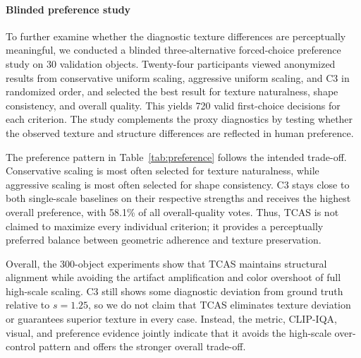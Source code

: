 \documentclass[times,twocolumn,final]{elsarticle}
\begin{document}
\paragraph{Blinded preference study}
To further examine whether the diagnostic texture differences are perceptually meaningful, we conducted a blinded three-alternative forced-choice preference study on 30 validation objects. Twenty-four participants viewed anonymized results from conservative uniform scaling, aggressive uniform scaling, and C3 in randomized order, and selected the best result for texture naturalness, shape consistency, and overall quality. This yields 720 valid first-choice decisions for each criterion. The study complements the proxy diagnostics by testing whether the observed texture and structure differences are reflected in human preference.

\begin{table}[!htbp]
\centering
\caption{Blinded three-alternative first-choice preference study. Percentages are computed over 720 valid decisions per criterion.}
\label{tab:preference}
\end{table}
\FloatBarrier

The preference pattern in Table~\ref{tab:preference} follows the intended trade-off. Conservative scaling is most often selected for texture naturalness, while aggressive scaling is most often selected for shape consistency. C3 stays close to both single-scale baselines on their respective strengths and receives the highest overall preference, with 58.1\% of all overall-quality votes. Thus, TCAS is not claimed to maximize every individual criterion; it provides a perceptually preferred balance between geometric adherence and texture preservation.

Overall, the 300-object experiments show that TCAS maintains structural alignment while avoiding the artifact amplification and color overshoot of full high-scale scaling. C3 still shows some diagnostic deviation from ground truth relative to $s = 1.25$, so we do not claim that TCAS eliminates texture deviation or guarantees superior texture in every case. Instead, the metric, CLIP-IQA, visual, and preference evidence jointly indicate that it avoids the high-scale over-control pattern and offers the stronger overall trade-off.
\end{document}

